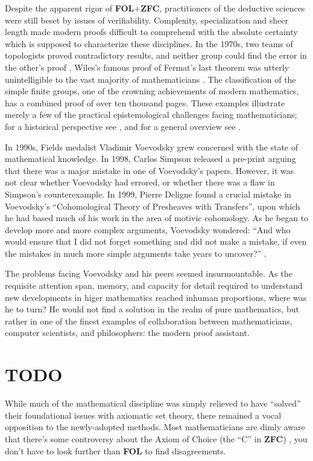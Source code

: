 \documentclass[12pt,twoside]{reedthesis}
\makeatletter
\let\oldindex\index
\renewcommand{\index}[1]
               {\oldindex{#1}\marginpar{\footnotesize\color{index}index: #1}}
\newcommand{\indeX}{\oldindex}
\newcommand{\indeX}{\index}
\newcommand{\TODO}[1]{\marginpar{\footnotesize\color{TODO}todo: #1}}
\newcommand{\abbreviation}[1]{\textbf{#1}\indeX{#1@\textbf{#1}}} %
\makeatother
\begin{document}
Despite the apparent rigor of \abbreviation{FOL}+\abbreviation{ZFC},
practitioners of the deductive sciences were still beset by issues of
verifiability. Complexity, specialization and sheer length made modern proofs
difficult to comprehend with the absolute certainty which is supposed to
characterize these disciplines. In the 1970s, two teams of topologists proved
contradictory results, and neither group could find the error in the other's
proof \cite{kolata}. Wiles's famous proof of Fermat's last theorem was utterly
unintelligible to the vast majority of mathematicians \cite{nyt}. The
classification of the simple finite groups, one of the crowning achievements of
modern mathematics, has a combined proof of over ten thousand pages. These
examples illustrate merely a few of the practical epistemological challenges
facing mathematicians; for a historical perspective see \cite{rigor-and-proof},
and for a general overview see \cite{fidelity}.

In 1990s, Fields medalist Vladimir Voevodsky grew concerned with the state
of mathematical knowledge. In 1998, Carlos Simpson released a pre-print arguing
that there was a major mistake in one of Voevodsky's papers. However, it was not
clear whether Voevodsky had errored, or whether there was a flaw in Simpson's
counterexample. In 1999, Pierre Deligne found a crucial mistake in Voevodsky's
``Cohomological Theory of Presheaves with Transfers'', upon which he had based
much of his work in the area of motivic cohomology. As he began to develop more
and more complex arguments, Voevodsky wondered: ``And who would ensure that I
did not forget something and did not make a mistake, if even the mistakes in
much more simple arguments take years to uncover?'' \cite{voevodsky-ias}.

The problems facing Voevodsky and his peers seemed insurmountable.
As the requisite attention span, memory, and capacity for detail required to
understand new developments in higer mathematics reached inhuman proportions,
where was he to turn? He would not find a solution in the realm of pure
mathematics, but rather in one of the finest examples of collaboration between
mathematicians, computer scientists, and philosophers: the modern proof
assistant. \TODO{reword}

\section*{TODO}

While much of the mathematical discipline was simply relieved to have ``solved''
their foundational issues with axiomatic set theory, there remained a vocal
opposition to the newly-adopted methods. Most mathematicians are dimly aware
that there's some controversy about the Axiom of Choice (the ``C'' in
\abbreviation{ZFC}) \cite{martin-lof-100-years}, you don't have to look further
than \abbreviation{FOL} to find disagreements.
\end{document}
